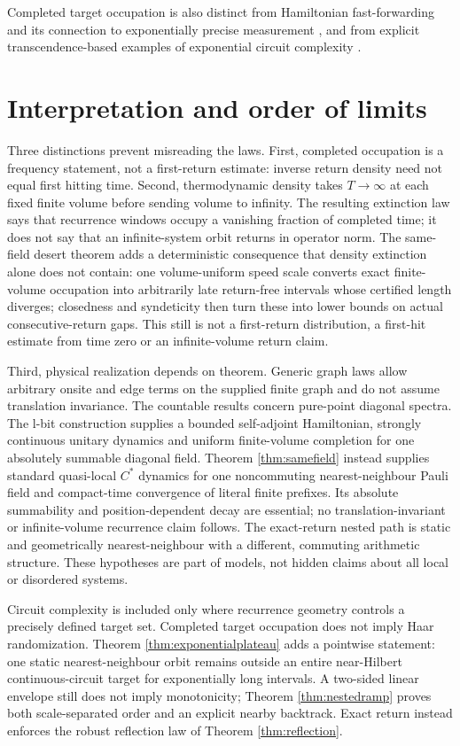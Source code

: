 Completed target occupation is also distinct from Hamiltonian
fast-forwarding and its connection to exponentially precise measurement
\cite{AtiaAharonov2017}, and from explicit transcendence-based examples of
exponential circuit complexity \cite{JiaWolf2023}.

\section{Interpretation and order of limits}

Three distinctions prevent misreading the laws.  First, completed occupation
is a frequency statement, not a first-return estimate: inverse return density
need not equal first hitting time.  Second, thermodynamic density takes
$T\to\infty$ at each fixed finite volume before sending volume to infinity.
The resulting extinction law says that recurrence windows occupy a vanishing
fraction of completed time; it does not say that an infinite-system orbit
returns in operator norm.  The same-field desert theorem adds a deterministic
consequence that density extinction alone does not contain: one
volume-uniform speed scale converts exact finite-volume occupation into
arbitrarily late return-free intervals whose certified length diverges;
closedness and syndeticity then turn these into lower bounds on actual
consecutive-return gaps.  This still is not a first-return distribution, a
first-hit estimate from time zero or an infinite-volume return claim.

Third, physical realization depends on theorem.  Generic graph laws allow
arbitrary onsite and edge terms on the supplied finite graph and do not
assume translation invariance.  The countable results concern pure-point
diagonal spectra.  The l-bit construction supplies a bounded self-adjoint
Hamiltonian, strongly continuous unitary dynamics and uniform finite-volume
completion for one absolutely summable diagonal field.  Theorem
\ref{thm:samefield} instead supplies standard quasi-local $C^*$ dynamics for
one noncommuting nearest-neighbour Pauli field and compact-time convergence of
literal finite prefixes.  Its absolute summability and position-dependent
decay are essential; no translation-invariant or infinite-volume recurrence
claim follows.  The exact-return nested path is static and geometrically
nearest-neighbour with a different, commuting arithmetic structure.  These
hypotheses are part of models, not hidden claims about all local or disordered
systems.

Circuit complexity is included only where recurrence geometry controls a
precisely defined target set.  Completed target occupation does not imply Haar
randomization.  Theorem \ref{thm:exponentialplateau} adds a pointwise statement:
one static nearest-neighbour orbit remains outside an entire near-Hilbert
continuous-circuit target for exponentially long intervals.  A two-sided
linear envelope still does not imply monotonicity;
Theorem \ref{thm:nestedramp} proves both scale-separated order and an explicit
nearby backtrack.  Exact return instead enforces the robust reflection law of
Theorem \ref{thm:reflection}.

